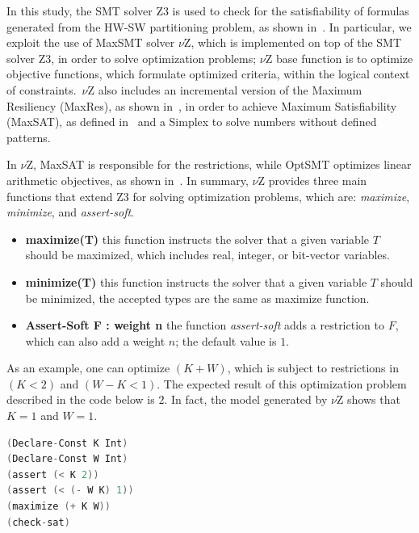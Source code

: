 \documentclass{doublecol-new}
\theoremstyle{TH}{
\newtheorem{lemma}{Lemma}
\newtheorem{theorem}[lemma]{Theorem}
\newtheorem{corrolary}[lemma]{Corrolary}
\newtheorem{conjecture}[lemma]{Conjecture}
\newtheorem{proposition}[lemma]{Proposition}
\newtheorem{claim}[lemma]{Claim}
\newtheorem{stheorem}[lemma]{Wrong Theorem}
\newtheorem{algorithm}{Algorithm}
}
\theoremstyle{THrm}{
\newtheorem{definition}{Definition}[section]
\newtheorem{question}{Question}[section]
\newtheorem{remark}{Remark}
\newtheorem{scheme}{Scheme}
}
\theoremstyle{THhit}{
\newtheorem{case}{Case}[section]
}
\begin{document}
In this study, the SMT solver Z3 is used to check for the satisfiability of formulas generated from the HW-SW partitioning problem, as shown in~\cite{Bjorner2014}. In particular, we exploit the use of MaxSMT solver $\nu$Z, which is implemented on top of the SMT solver Z3, in order to solve optimization problems; $\nu$Z base function is to optimize objective functions, which formulate optimized criteria, within the logical context of constraints.~$\nu$Z also includes an incremental version of the Maximum Resiliency (MaxRes), as shown in~\cite{Federica2008}, in order to achieve Maximum Satisfiability (MaxSAT), as defined in~\cite{NarodytskaN} and a Simplex to solve numbers without defined patterns. 

In $\nu$Z, MaxSAT is responsible for the restrictions, while OptSMT optimizes linear arithmetic objectives, as shown in~\cite{Bjorner2015}. In summary, $\nu$Z provides three main functions that extend Z3 for solving optimization problems, which are: \textit{maximize}, \textit{minimize}, and \textit{assert-soft}.

\begin{itemize}
\item{\textbf{maximize(T)}
this function instructs the solver that a given variable $T$ should be maximized, which includes real, integer, or bit-vector variables.}
\item{\textbf{minimize(T)}
this function instructs the solver that a given variable $T$ should be minimized, the accepted types are the same as maximize function.}
\item{\textbf{Assert-Soft F : weight n}
the function \textit{assert-soft} adds a restriction to $F$, which can also add a weight $n$; the default value is $1$.}
\end{itemize}

As an example, one can optimize $\left(K + W\right)$, which is subject to restrictions in $\left(K < 2\right)$ and $\left(W - K < 1\right)$. The expected result of this optimization problem described in the code below is $2$. In fact, the model generated by $\nu$Z shows that $K = 1$ and $W = 1$.

\begin{lstlisting}[basicstyle=\footnotesize,language=C,caption={OpenMP basic Example.},label={vZ},numbersep=7pt,frame=tb,captionpos=t,numberstyle=\tiny]
(Declare-Const K Int) 
(Declare-Const W Int)
(assert (< K 2)) 
(assert (< (- W K) 1))
(maximize (+ K W)) 
(check-sat)
\end{lstlisting}
\end{document}
